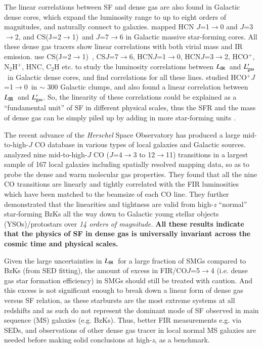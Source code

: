 \documentclass[legal,11pt]{article}
\def\,{\thinspace}
\def\to{$\rightarrow$}
\def\LIR     {$L_{\rm IR}$}
\def\Lgas    {$L'_{\rm gas}$}
\def\HCOP       {HCO$^{+}$}
\def\HCNoz      {HCN\,$J$=1$\rightarrow$0}
\def\HCOPoz      {HCO$^+$\,$J$=1$\rightarrow$0}
\def\CSto        {CS(J=2$\rightarrow$1)\ }
\def\HCNtt        {HCN\,$J$=3$\rightarrow$2}
\def\CSss          {CS\,$J$=7$\rightarrow$6}
\begin{document}
The linear correlations between SF and dense gas are also found in Galactic
dense cores, which expand the luminosity range to up to eight orders of
magnitudes, and naturally connect to galaxies.  \citet{wes10} mapped HCN
$J$=1\to0 and $J$=3\to2, and \CSto and $J$=7\to6 in Galactic massive
star-forming cores. All these dense gas tracers show linear correlations with
both virial mass and IR emission.  \citet{Reiter2011} use \CSto, \CSss, \HCNoz,
\HCNtt, \HCOP, N$_2$H$^+$, HNC, C$_2$H etc. to study the luminosity
correlations between \LIR\ and \Lgas\ in Galactic dense cores, and find
correlations for all these lines.  \cite{Ma12} studied \HCOPoz\ in $\sim$ 300
Galactic clumps, and also found a linear correlation between \LIR\ and \Lgas.
So, the linearity of these correlations could be explained as a ``fundamental
unit'' of SF in different physical scales, thus the SFR and the mass of dense
gas can be simply piled up by adding in more star-forming units \citep{weg05}.



The recent advance of the {\it Herschel} Space Observatory has produced a large
mid-to-high-$J$ CO database in various types of local galaxies and Galactic
sources. \cite{LGI2015} analyzed nine mid-to-high-$J$ CO ($J$=4\to3 to 12\to11)
transitions in a largest sample of 167 local galaxies including spatially
resolved mapping data, so as to probe the dense and warm molecular gas
properties. They found that all the nine CO transitions are linearly and
tightly correlated with the FIR luminosities which have been matched to the
beamsize of each CO line. They further demonstrated that the linearities and
tightness are valid from high-{\it z} ``normal'' star-forming BzKs all the way
down to Galactic young stellar objects (YSOs)/protostars over {\it 14 orders of
magnitude.} {\bf All these results indicate that the physics of SF in dense gas
is universally invariant across the cosmic time and physical scales.}


Given the large uncertainties in \LIR\ for a large fraction of SMGs compared to
BzKs (from SED fitting), the amount of excess in FIR/CO$J$=5\to4 (i.e. dense
gas star formation efficiency) in SMGs should still be treated with caution.
And this excess is not significant enough to break down a linear form of dense
gas versus SF relation, as these starbursts are the most extreme systems at all
redshifts and as such do not represent the dominant mode of SF observed in main
sequence (MS) galaxies (e.g. BzKs). Thus, better FIR measurements e.g. via
SEDs, and observations of other dense gas tracer in local normal MS galaxies
are needed before making solid conclusions at high-{\it z}, as a benchmark.
\end{document}
